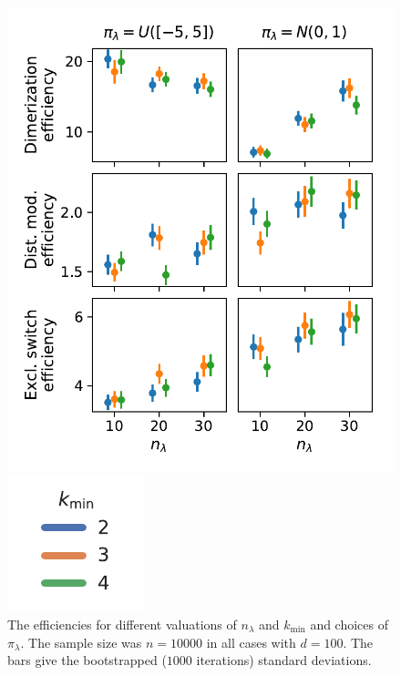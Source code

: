 \begin{figure}[htb]
  \centering
  \begin{minipage}{0.6\textwidth}
    \vfill
    \includegraphics[scale=.5]{gfx/efficiency_priors.pdf}
    \vfill
  \end{minipage}
  \begin{minipage}{0.2\textwidth}
    \vfill
    \includegraphics[scale=.7]{gfx/legend.pdf}
    \vfill
  \end{minipage}
  \caption[Estimates for varying ${n}_{\lambda}$ and
  ${k}_{\min}$]{The efficiencies for different valuations of
    ${n}_{\lambda}$ and ${k}_{\min} $
    and choices of ${\pi}_{\lambda}$. The sample size was
    $n=\num{10000}$ in all cases
    with $d=100$.
    The bars give the bootstrapped ($1000$ iterations) standard
  deviations.\label{fig:efficiencies_prior}}
\end{figure}


